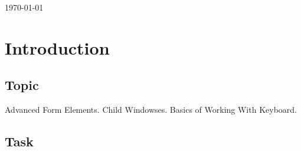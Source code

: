 \documentclass[12pt]{article}
\begin{document}
\begin{titlepage}
\begin{center}
      \vspace{5 mm}


      {\large \today}\\[3cm] %




      \vfill %
      \end{center}
      \end{titlepage}



  \section{Introduction}

  \subsection{Topic}

  
Advanced Form Elements. Child Windowses. Basics of Working With Keyboard.

  \subsection{Task}
\end{document}
